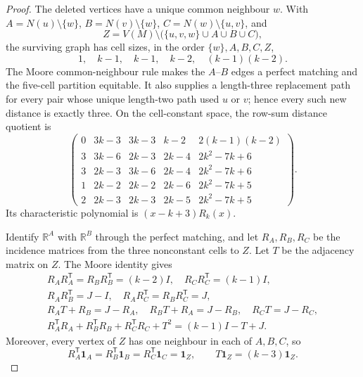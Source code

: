 \documentclass[a4paper,10pt,reqno]{amsart}
\theoremstyle{plain}
\theoremstyle{definition}
\theoremstyle{remark}
\newcommand{\one}{\mathbf 1}
\begin{document}
\begin{proof}
The deleted vertices have a unique common neighbour \(w\).  With
\(A=N(u)\setminus\{w\}\), \(B=N(v)\setminus\{w\}\),
\(C=N(w)\setminus\{u,v\}\), and
\[
 Z=V(M)\setminus\bigl(\{u,v,w\}\cup A\cup B\cup C\bigr),
\]
the surviving graph has cell sizes, in the order \(\{w\},A,B,C,Z\),
\[
 1,\quad k-1,\quad k-1,\quad k-2,\quad (k-1)(k-2).
\]
The Moore common-neighbour rule makes the \(A\)--\(B\) edges a perfect
matching and the five-cell partition equitable.  It also supplies a
length-three replacement path for every pair whose unique length-two path
used \(u\) or \(v\); hence every such new distance is exactly three.  On the
cell-constant space, the row-sum distance quotient is
\[
\begin{pmatrix}
0&3k-3&3k-3&k-2&2(k-1)(k-2)\\
3&3k-6&2k-3&2k-4&2k^2-7k+6\\
3&2k-3&3k-6&2k-4&2k^2-7k+6\\
1&2k-2&2k-2&2k-6&2k^2-7k+5\\
2&2k-3&2k-3&2k-5&2k^2-7k+5
\end{pmatrix}.
\]
Its characteristic polynomial is \((x-k+3)R_k(x)\).

Identify \(\mathbb R^A\) with \(\mathbb R^B\) through the perfect matching,
and let \(R_A,R_B,R_C\) be the incidence matrices from the three
nonconstant cells to \(Z\).  Let \(T\) be the adjacency matrix on \(Z\).
The Moore identity gives
\[
\begin{gathered}
R_AR_A^{\mathsf T}=R_BR_B^{\mathsf T}=(k-2)I,\quad
R_CR_C^{\mathsf T}=(k-1)I,\\
R_AR_B^{\mathsf T}=J-I,\quad
R_AR_C^{\mathsf T}=R_BR_C^{\mathsf T}=J,\\
R_AT+R_B=J-R_A,\quad
R_BT+R_A=J-R_B,\quad
R_CT=J-R_C,\\
R_A^{\mathsf T}R_A+R_B^{\mathsf T}R_B+R_C^{\mathsf T}R_C+T^2
=(k-1)I-T+J.
\end{gathered}
\]
Moreover, every vertex of \(Z\) has one neighbour in each of \(A,B,C\),
so
\[
 R_A^{\mathsf T}\one_A
 =R_B^{\mathsf T}\one_B
 =R_C^{\mathsf T}\one_C
 =\one_Z,
 \qquad T\one_Z=(k-3)\one_Z.
\]


\end{proof}
\end{document}

